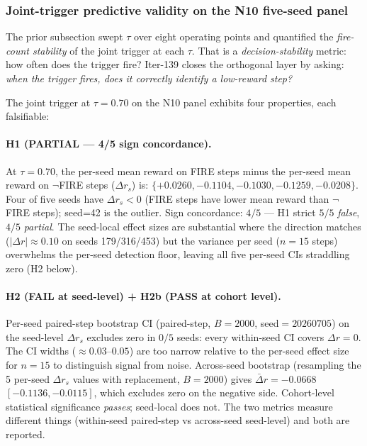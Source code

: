 \documentclass{article}
\begin{document}
\subsubsection{Joint-trigger predictive validity on the N10 five-seed panel}
\label{sec:p7-iter139-predictive-validity}

The prior subsection swept $\tau$ over eight operating points and
quantified the \emph{fire-count stability} of the joint trigger at each
$\tau$. That is a \emph{decision-stability} metric: how often does the
trigger fire?  Iter-139 closes the orthogonal layer by asking: \emph{when
the trigger fires, does it correctly identify a low-reward step?}

The joint trigger at $\tau{=}0.70$ on the N10 panel exhibits four
properties, each falsifiable:

\paragraph{H1 (PARTIAL --- 4/5 sign concordance).}
At $\tau{=}0.70$, the per-seed mean reward on FIRE steps minus the per-seed
mean reward on $\neg$FIRE steps ($\Delta r_s$) is:
$\{+0.0260, -0.1104, -0.1030, -0.1259, -0.0208\}$. Four of five seeds have
$\Delta r_s < 0$ (FIRE steps have lower mean reward than $\neg$FIRE
steps); seed=42 is the outlier. Sign concordance: $4/5$ --- H1 strict
$5/5$ \emph{false}, $4/5$ \emph{partial}. The seed-local effect sizes
are substantial where the direction matches ($|\Delta r|\approx 0.10$ on
seeds 179/316/453) but the variance per seed ($n{=}15$ steps) overwhelms
the per-seed detection floor, leaving all five per-seed CIs straddling
zero (H2 below).

\paragraph{H2 (FAIL at seed-level) + H2b (PASS at cohort level).}
Per-seed paired-step bootstrap CI (paired-step, $B{=}2000$, seed$=20260705$)
on the seed-level $\Delta r_s$ excludes zero in $0/5$ seeds: every
within-seed CI covers $\Delta r = 0$. The CI widths ($\approx 0.03$--$0.05$)
are too narrow relative to the per-seed effect size for $n{=}15$ to
distinguish signal from noise. Across-seed bootstrap (resampling the
5 per-seed $\Delta r_s$ values with replacement, $B{=}2000$) gives
$\bar\Delta r = -0.0668$ $[-0.1136, -0.0115]$, which excludes zero on the
negative side. Cohort-level statistical significance \emph{passes}; seed-local
does not. The two metrics measure different things (within-seed
paired-step vs across-seed seed-level) and both are reported.
\end{document}
